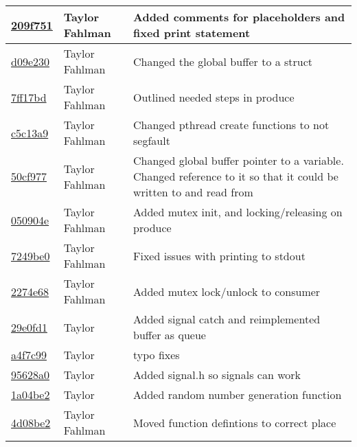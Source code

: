 \begin{tabular}{l l l}
\href{https://github.com/fahlmant/cs444/commit/209f7513f40020a3ae61565dd7f115b7c72b8472}{209f751} & Taylor Fahlman & Added comments for placeholders and fixed print statement\\\hline
\href{https://github.com/fahlmant/cs444/commit/d09e23095844c4b70beb8f084938a6716eb11f24}{d09e230} & Taylor Fahlman & Changed the global buffer to a struct\\\hline
\href{https://github.com/fahlmant/cs444/commit/7ff17bdada1706eb1057ba678bde47c8f5b18774}{7ff17bd} & Taylor Fahlman & Outlined needed steps in produce\\\hline
\href{https://github.com/fahlmant/cs444/commit/c5c13a973ba6f8363baf95b9e2330ea4dca16651}{c5c13a9} & Taylor Fahlman & Changed pthread create functions to not segfault\\\hline
\href{https://github.com/fahlmant/cs444/commit/50cf97754d7e3aa081ef30f56af307d2671969ff}{50cf977} & Taylor Fahlman & Changed global buffer pointer to a variable. Changed reference to it so that it could be written to and read from\\\hline
\href{https://github.com/fahlmant/cs444/commit/050904eeb0342d93e297fec347a08544cc99ce07}{050904e} & Taylor Fahlman & Added mutex init, and locking/releasing on produce\\\hline
\href{https://github.com/fahlmant/cs444/commit/7249be01ba7edbda6723b5acbe59f46efa2886a9}{7249be0} & Taylor Fahlman & Fixed issues with printing to stdout\\\hline
\href{https://github.com/fahlmant/cs444/commit/2274e684608cf836dc48bda6d3ec5d5d9b66f5fb}{2274e68} & Taylor Fahlman & Added mutex lock/unlock to consumer\\\hline
\href{https://github.com/fahlmant/cs444/commit/29e0fd1c29a38fec3bd5a999d8bf8efa513c70fd}{29e0fd1} & Taylor & Added signal catch and reimplemented buffer as queue\\\hline
\href{https://github.com/fahlmant/cs444/commit/a4f7c992ec397d9b510126246137537b77e55930}{a4f7c99} & Taylor & typo fixes\\\hline
\href{https://github.com/fahlmant/cs444/commit/95628a0549663a27c0a3ef1f04118db28e89acda}{95628a0} & Taylor & Added signal.h so signals can work\\\hline
\href{https://github.com/fahlmant/cs444/commit/1a04be2d025bdf2f264d2fdcd2dad95ded4fb324}{1a04be2} & Taylor & Added random number generation function\\\hline
\href{https://github.com/fahlmant/cs444/commit/4d08be28f8900f197846be9ac81d7c0d4c45cc03}{4d08be2} & Taylor Fahlman & Moved function defintions to correct place\\\hline

\end{tabular}

